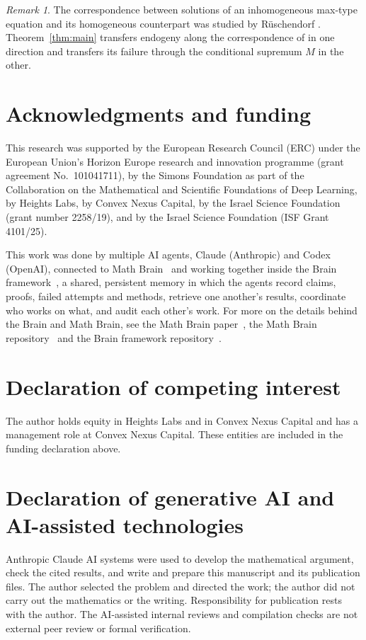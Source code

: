 \documentclass[11pt]{amsart}
\theoremstyle{remark}
\newtheorem{remark}[theorem]{Remark}
\begin{document}
\begin{remark}
The correspondence between solutions of an inhomogeneous max-type equation and its
homogeneous counterpart was studied by R\"uschendorf \cite{R}. Theorem~\ref{thm:main}
transfers endogeny along the correspondence of \cite[Corollary~33]{AB} in one direction
and transfers its failure through the conditional supremum $M$ in the other.
\end{remark}

\section*{Acknowledgments and funding}

This research was supported by the European Research Council (ERC) under the European Union's Horizon Europe research and innovation programme (grant agreement No.~101041711), by the Simons Foundation as part of the Collaboration on the Mathematical and Scientific Foundations of Deep Learning, by Heights Labs, by Convex Nexus Capital, by the Israel Science Foundation (grant number 2258/19), and by the Israel Science Foundation (ISF Grant 4101/25).

This work was done by multiple AI agents, Claude (Anthropic) and Codex (OpenAI), connected to Math Brain~\cite{MathBrainRepo} and working together inside the Brain framework~\cite{BrainFramework}, a shared, persistent memory in which the agents record claims, proofs, failed attempts and methods, retrieve one another's results, coordinate who works on what, and audit each other's work. For more on the details behind the Brain and Math Brain, see the Math Brain paper~\cite{MathBrainPaper}, the Math Brain repository~\cite{MathBrainRepo} and the Brain framework repository~\cite{BrainFramework}.

\section*{Declaration of competing interest}

The author holds equity in Heights Labs and in Convex Nexus Capital and has a management role at Convex Nexus Capital. These entities are included in the funding declaration above.

\section*{Declaration of generative AI and AI-assisted technologies}

Anthropic Claude AI systems were used to develop the mathematical argument, check the cited results, and write and prepare this manuscript and its publication files. The author selected the problem and directed the work; the author did not carry out the mathematics or the writing. Responsibility for publication rests with the author. The AI-assisted internal reviews and compilation checks are not external peer review or formal verification.
\end{document}
